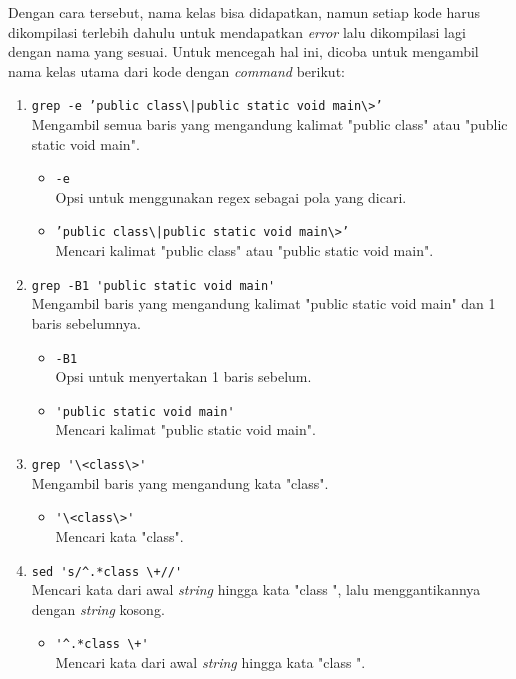 Dengan cara tersebut, nama kelas bisa didapatkan, namun setiap kode harus dikompilasi terlebih dahulu untuk mendapatkan \textit{error} lalu dikompilasi lagi dengan nama yang sesuai. Untuk mencegah hal ini, dicoba untuk mengambil nama kelas utama dari kode dengan  \textit{command} berikut:
\begin{enumerate}
    \item \texttt{grep -e 'public class\textbackslash|public static void main\textbackslash>'} \\ Mengambil semua baris yang mengandung kalimat "public class" atau "public static void main".
    \begin{itemize}
        \item \verb|-e| \\ Opsi untuk menggunakan regex sebagai pola yang dicari.
        \item \texttt{'public class\textbackslash|public static void main\textbackslash>'} \\ Mencari kalimat "public class" atau "public static void main".
    \end{itemize}
    \item \verb|grep -B1 'public static void main'| \\ Mengambil baris yang mengandung kalimat "public static void main" dan 1 baris sebelumnya.
    \begin{itemize}
        \item \verb|-B1| \\ Opsi untuk menyertakan 1 baris sebelum.
        \item \verb|'public static void main'| \\ Mencari kalimat "public static void main".
    \end{itemize}
    \item \verb|grep '\<class\>'| \\ Mengambil baris yang mengandung kata "class".
    \begin{itemize}
        \item \verb|'\<class\>'| \\ Mencari kata "class".
    \end{itemize}
    \item \verb|sed 's/^.*class \+//'| \\ Mencari kata dari awal \textit{string} hingga kata "class ", lalu menggantikannya dengan \textit{string} kosong.
    \begin{itemize}
        \item \verb|'^.*class \+'| \\ Mencari kata dari awal \textit{string} hingga kata "class ".

\end{itemize}
\end{enumerate}
